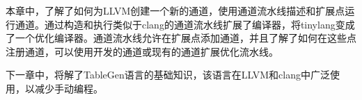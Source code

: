 本章中，了解了如何为LLVM创建一个新的通道，使用通道流水线描述和扩展点运行通道。通过构造和执行类似于clang的通道流水线扩展了编译器，将tinylang变成了一个优化编译器。通道流水线允许在扩展点添加通道，并且了解了如何在这些点注册通道，可以使用开发的通道或现有的通道扩展优化流水线。

下一章中，将解了TableGen语言的基础知识，该语言在LLVM和clang中广泛使用，以减少手动编程。